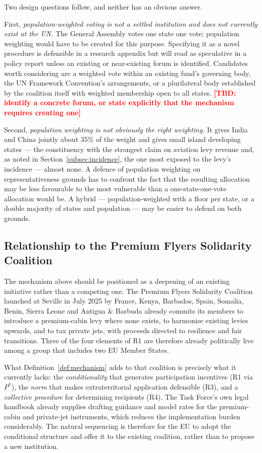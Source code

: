 \documentclass[11pt]{article}
\newcommand{\tbd}[1]{\textcolor{red}{\textbf{[TBD: #1]}}}
\begin{document}
Two design questions follow, and neither has an obvious answer.

First, \emph{population-weighted voting is not a settled institution and does not
currently exist at the UN.} The General Assembly votes one state one vote;
population weighting would have to be created for this purpose. Specifying it as
a novel procedure is defensible in a research appendix but will read as
speculative in a policy report unless an existing or near-existing forum is
identified. Candidates worth considering are a weighted vote within an existing
fund's governing body, the UN Framework Convention's arrangements, or a plurilateral
body established by the coalition itself with weighted membership open to all
states. \tbd{identify a concrete forum, or state explicitly that the mechanism
requires creating one}

Second, \emph{population weighting is not obviously the right weighting.} It
gives India and China jointly about 35\% of the weight and gives small island
developing states --- the constituency with the strongest claim on aviation
levy revenue and, as noted in Section~\ref{subsec:incidence}, the one most
exposed to the levy's incidence --- almost none. A defence of population
weighting on representativeness grounds has to confront the fact that the
resulting allocation may be less favourable to the most vulnerable than a
one-state-one-vote allocation would be. A hybrid --- population-weighted with a
floor per state, or a double majority of states and population --- may be
easier to defend on both grounds.

\subsection{Relationship to the Premium Flyers Solidarity Coalition}

The mechanism above should be positioned as a deepening of an existing
initiative rather than a competing one. The Premium Flyers Solidarity Coalition
launched at Seville in July 2025 by France, Kenya, Barbados, Spain, Somalia,
Benin, Sierra Leone and Antigua \& Barbuda already commits its members to
introduce a premium-cabin levy where none exists, to harmonise existing levies
upwards, and to tax private jets, with proceeds directed to resilience and fair
transitions. Three of the four elements of R1 are therefore already
politically live among a group that includes two EU Member States.

What Definition~\ref{def:mechanism} adds to that coalition is precisely what it
currently lacks: the \emph{conditionality} that generates participation
incentives (R1 via $P^{*}$), the \emph{norm} that makes extraterritorial
application defensible (R3), and a \emph{collective procedure} for determining
recipients (R4). The Task Force's own legal handbook already supplies drafting
guidance and model rates for the premium-cabin and private-jet instruments,
which reduces the implementation burden considerably. The natural sequencing is
therefore for the EU to adopt the conditional structure and offer it to the
existing coalition, rather than to propose a new institution.
\end{document}
